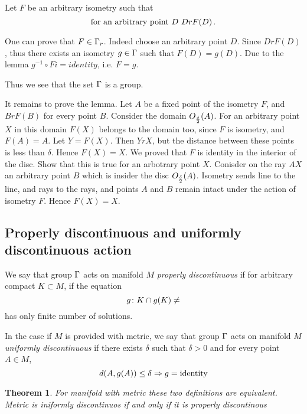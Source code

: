 \documentclass[12pt]{article}
\theoremstyle{theorem}
\newtheorem{thm}{Theorem}
\theoremstyle{lemma}
\numberwithin{equation}{section}
\begin{document}
 Let $F$ be an arbitrary isometry such that
       \begin{equation*}
\hbox{for an arbitrary point $D$}\,\,
      DrF(D)\,.
\end{equation*}



One can prove that $F\in{\Gamma}_r$. Indeed 
choose an arbitrary point $D$.
Since $DrF(D)$, thus there exists an isometry
$g\in {\Gamma}$ such that $F(D)=g(D)$. 
 Due to the lemma $g^{-1}\circ Fi=identity$, i.e. $F=g$.

Thus we see that the set ${\Gamma}$ is a group.

 It remains to  prove the lemma.
Let $A$ be a fixed point of the isometry $F$,
and $BrF(B)$ for every point $B$. Consider
the domain $O_{\delta\over 2}(A)$. 
For an arbitrary
point $X$ in this  domain $F(X)$ belongs to the domain too,
since $F$ is isometry, and $F(A)=A$. Let $Y=F(X)$.
Then $YrX$, but the distance between these points is less than 
$\delta$. Hence $F(X)=X$.  We proved that $F$ is identity in
the interior of the disc.  Show that this is true for an arbotrary
point $X$. Conisder on the ray $AX$ an arbitrary point $B$
which is insider the disc $O_{\delta\over 2}(A)$.
Isometry sends line to the line, and rays to the rays, and
points $A$ and $B$ remain intact under the action of isometry
  $F$.  Hence $F(X)=X$.

\subsection{Properly discontinuous and uniformly 
discontinuous action}
   We say that group ${\Gamma}$ acts on manifold $M$ {\it properly discontinuous}
if for arbitrary compact $K\subset M$, if the equation
           \begin{equation*}
     g\colon   K\cap g(K)\not=\empty                
           \end{equation*}
has only finite number of solutions.

\smallskip

  In the case if $M$ is provided with metric,
    we say that group ${\Gamma}$ acts on manifold $M$ {\it uniformly 
discontinuous} if there exists $\delta$ such that $\delta>0$
and for every point $A\in M$,
           \begin{equation*}
        d(A, g(A))\leq \delta \Rightarrow g={\rm identity}
            \end{equation*}


\begin{thm}
For manifold with metric these two definitions are equivalent.
  Metric is iniformly discontinuos if and only if it is properly
discontinous
\end{thm}
\end{document}
